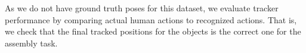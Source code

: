 As we do not have ground truth poses for this dataset, we evaluate tracker performance by comparing actual human actions to recognized actions. That is, we check that the final tracked positions for the objects is the correct one for the assembly task.

